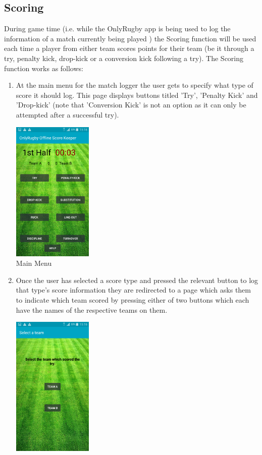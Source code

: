 \documentclass[hidelinks,a4paper,12pt]{article}
\begin{document}
	\subsection{Scoring}
		During game time (i.e. while the OnlyRugby app is being used to log the information of a match currently being played ) the Scoring function will be used each time a player from either team scores points for their team (be it through a try, penalty kick, drop-kick or a conversion kick following a try). The Scoring function works as follows:
		\begin{enumerate}
			\item At the main menu for the match logger the user gets to specify what type of score it should log. This page displays buttons titled 'Try', 'Penalty Kick' and  'Drop-kick' (note that 'Conversion Kick' is not an option as it can only be attempted after a successful try). 
		\begin{center}
	 	 	 \includegraphics[width=0.3\textwidth] {./images/game_menu.png}\\[0.4cm]
	 	 	 \caption{Main Menu}
		\end{center}
			\item Once the user has selected a score type and pressed the relevant  button to log that type's score information they are redirected to a page which asks them to indicate which team scored by pressing either of two buttons which each have the names of the respective teams on them.
		\begin{center}
  			 \includegraphics[width=0.3\textwidth] {./images/choose_try_team.png}\\[0.4cm]

\end{center}
\end{enumerate}
\end{document}
